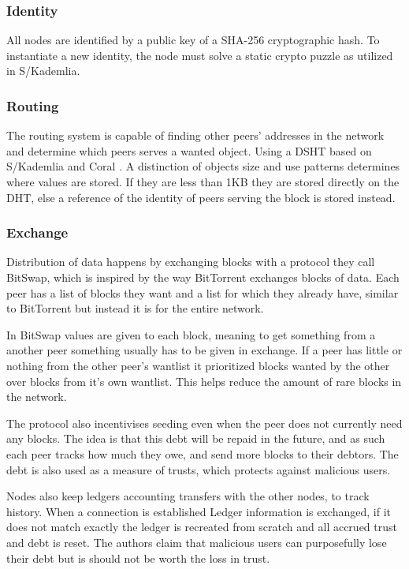 \subsubsection{Identity}
All nodes are identified by a public key of a SHA-256 cryptographic hash. To instantiate a new identity, the node must solve a static crypto puzzle as utilized in S/Kademlia\cite{baumgart2007skademlia}.

\subsubsection{Routing}
The routing system is capable of finding other peers' addresses in the network and determine which peers serves a wanted object. Using a \ac{DSHT} based on S/Kademlia and Coral \cite{baumgart2007skademlia, freedman2004coral}. A distinction of objects size and use patterns determines where values are stored. If they are less than 1KB they are stored directly on the \ac{DHT}, else a reference of the identity of peers serving the block is stored instead. 

\subsubsection{Exchange}
Distribution of data happens by exchanging blocks with a protocol they call BitSwap, which is inspired by the way BitTorrent exchanges blocks of data. Each peer has a list of blocks they want and a list for which they already have, similar to BitTorrent but instead it is for the entire network.

In BitSwap values are given to each block, meaning to get something from a another peer something usually has to be given in exchange. If a peer has little or nothing from the other peer's wantlist it prioritized blocks wanted by the other over blocks from it's own wantlist. This helps reduce the amount of rare blocks in the network.

The protocol also incentivises seeding even when the peer does not currently need any blocks. The idea is that this debt will be repaid in the future, and as such each peer tracks how much they owe, and send more blocks to their debtors. The debt is also used as a measure of trusts, which protects against malicious users.

Nodes also keep ledgers accounting transfers with the other nodes, to track history. When a connection is established Ledger information is exchanged, if it does not match exactly the ledger is recreated from scratch and all accrued trust and debt is reset. The authors claim that malicious users can purposefully lose their debt but is should not be worth the loss in trust.


